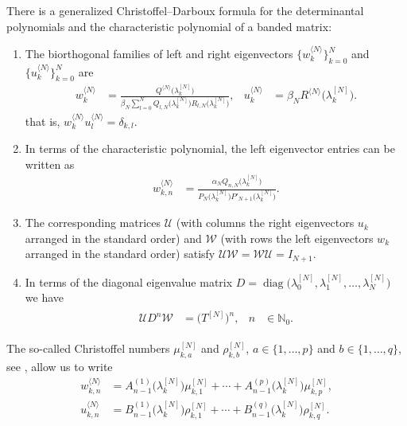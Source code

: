 \documentclass[11pt]{amsart}
\theoremstyle{plain}
\newcommand{\diag}{\operatorname{diag}}
\newcommand{\N}{\mathbb{N}}
\newcommand{\1}{\text{\fontseries{bx}\selectfont \textup 1}}
\begin{document}
There is a generalized Christoffel--Darboux formula for the determinantal polynomials and the characteristic polynomial of a banded matrix:
\begin{enumerate}
	\item The biorthogonal families of left and right eigenvectors $\big\{w^{\langle N\rangle}_k\big\}_{k=0}^{N}$ and $\big\{u^{\langle N\rangle}_k\big\}_{k=0}^{N}$ are
	\begin{equation}\label{eq:eigenvectors}
		\begin{aligned}
			w^{\langle N\rangle}_{k}&=\frac{ Q^{\langle N\rangle}\big(\lambda^{[N]}_k\big)}{\beta_N\sum_{l=0}^{N}Q_{l,N}\big(\lambda^{[N]}_k\big)R_{l,N}\big(\lambda^{[N]}_k\big)}, &
			u^{\langle N\rangle}_{k}&=\beta_N R^{\langle N\rangle}\big(\lambda^{[N]}_k\big).
		\end{aligned}
	\end{equation}
	that is, $w^{\langle N\rangle}_{k}u^{\langle N\rangle}_{l}=\delta_{k,l}$.
	
	\item In terms of the characteristic polynomial, the left eigenvector entries can be written as
	\[	\begin{aligned}
		w^{\langle N\rangle}_{k,n}&=
		\frac{ \alpha_N Q_{n,N}\big(\lambda^{[N]}_k\big)
		}{
			P_{N}\big(\lambda^{[N]}_k\big)P'_{N+1}\big(\lambda^{[N]}_k\big)}.
	\end{aligned}\]
	
	\item The corresponding matrices $\mathscr U$ (with columns the right eigenvectors $u_k$ arranged in the standard order) and 
	$\mathscr W$ (with rows the left eigenvectors $w_k$ arranged in the standard order) satisfy
	$ \mathscr U\mathscr W=\mathscr W\mathscr U=I_{N+1}$.
	
	\item In terms of the diagonal eigenvalue matrix $D=\diag\big(\lambda^{[N]}_0,\lambda^{[N]}_1,\dots,\lambda^{[N]}_{N}\big)$ we have
	\begin{align}\label{eq:UDnW=Jn}
		\begin{aligned}
			\mathscr UD^n\mathscr W&=\big(T^{[N]}\big)^n, & n&\in\N_0.
		\end{aligned}
	\end{align}
\end{enumerate}

The so-called Christoffel numbers $\mu^{[N]}_{k,a}$ and $\rho^{[N]}_{k,b}$, $a\in\{1,\dots,p\}$ and $b\in\{1,\dots,q\}$, see \cite{BFM1}, allow us to write
\[	\begin{aligned}
	w^{\langle N\rangle}_{k,n}&= A_{n-1}^{(1)}\big(\lambda^{[N]}_k\big)\mu^{[N]}_{k,1} +\cdots +A_{n-1}^{(p)}\big(\lambda^{[N]}_k\big)\mu^{[N]}_{k,p},\\
	\label{eq:discrete_linear_form_typeII}
	u^{\langle N\rangle}_{k,n}&= B_{n-1}^{(1)}\big(\lambda^{[N]}_k\big)\rho^{[N]}_{k,1} +\cdots +B_{n-1}^{(q)}\big(\lambda^{[N]}_k\big)\rho^{[N]}_{k,q}.
\end{aligned}\]
\end{document}
